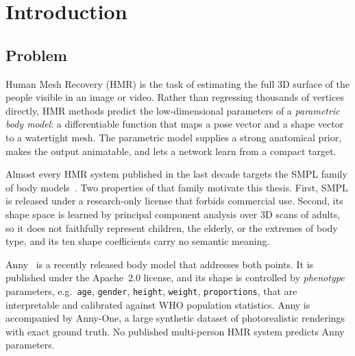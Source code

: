%


\chapter{Introduction}
\label{ch:intro}

\section{Problem}

Human Mesh Recovery (HMR) is the task of estimating the full 3D surface of the
people visible in an image or video. Rather than regressing thousands of
vertices directly, HMR methods predict the low-dimensional parameters of a
\emph{parametric body model}: a differentiable function that maps a pose vector
and a shape vector to a watertight mesh. The parametric model supplies a strong
anatomical prior, makes the output animatable, and lets a network learn from a
compact target.

Almost every HMR system published in the last decade targets the SMPL family of
body models~\cite{loper2015smpl,romero2017mano,pavlakos2019smplx}. Two
properties of that family motivate this thesis. First, SMPL is released under a
research-only license that forbids commercial use. Second, its shape space is
learned by principal component analysis over 3D scans of adults, so it does not
faithfully represent children, the elderly, or the extremes of body type, and
its ten shape coefficients carry no semantic meaning.

Anny~\cite{bregier2025anny} is a recently released body model that addresses
both points. It is published under the Apache~2.0 license, and its shape is
controlled by \emph{phenotype} parameters, e.g.\ \texttt{age}, \texttt{gender},
\texttt{height}, \texttt{weight}, \texttt{proportions}, that are interpretable
and calibrated against WHO population statistics. Anny is accompanied by
Anny-One, a large synthetic dataset of photorealistic renderings with exact
ground truth. No published multi-person HMR system predicts Anny parameters.

